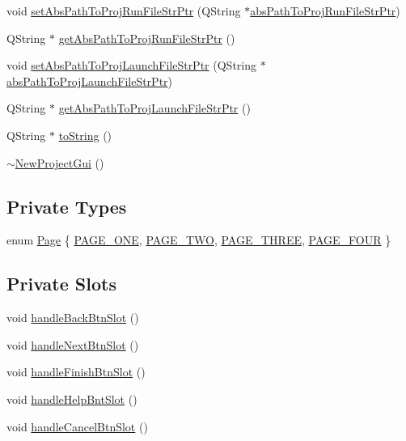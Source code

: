 \begin{DoxyCompactItemize}
\item 
void \hyperlink{class_new_project_gui_ab70a65b041c40d501a431bb7ba3f5ad1}{set\-Abs\-Path\-To\-Proj\-Run\-File\-Str\-Ptr} (Q\-String $\ast$\hyperlink{class_new_project_gui_ad8f25243a46ce10b6f1bc0c9ddb3e7eb}{abs\-Path\-To\-Proj\-Run\-File\-Str\-Ptr})
\item 
Q\-String $\ast$ \hyperlink{class_new_project_gui_ae32efb6021b235257d0b0092180e121b}{get\-Abs\-Path\-To\-Proj\-Run\-File\-Str\-Ptr} ()
\item 
void \hyperlink{class_new_project_gui_af90561864043fb757f8db808aadfa4b6}{set\-Abs\-Path\-To\-Proj\-Launch\-File\-Str\-Ptr} (Q\-String $\ast$\hyperlink{class_new_project_gui_a9056b4e1033cde862dd86bac6c0c6070}{abs\-Path\-To\-Proj\-Launch\-File\-Str\-Ptr})
\item 
Q\-String $\ast$ \hyperlink{class_new_project_gui_a6271114ad664216313d2427eb51820ab}{get\-Abs\-Path\-To\-Proj\-Launch\-File\-Str\-Ptr} ()
\item 
Q\-String $\ast$ \hyperlink{class_new_project_gui_a06d242dd2c162f66284bf468e17c5c73}{to\-String} ()
\item 
\hyperlink{class_new_project_gui_a2057fcc82bc632a4c7c506274dd45fe1}{$\sim$\-New\-Project\-Gui} ()
\end{DoxyCompactItemize}
\subsection*{Private Types}
\begin{DoxyCompactItemize}
\item 
enum \hyperlink{class_new_project_gui_a7dd25d019611ddc0fd2b357e0f3a446c}{Page} \{ \hyperlink{class_new_project_gui_a7dd25d019611ddc0fd2b357e0f3a446ca395ebc3cb6570b4ccb4c2909346117f2}{P\-A\-G\-E\-\_\-\-O\-N\-E}, 
\hyperlink{class_new_project_gui_a7dd25d019611ddc0fd2b357e0f3a446ca1e6736f0205ad831d43236b4f1caaf36}{P\-A\-G\-E\-\_\-\-T\-W\-O}, 
\hyperlink{class_new_project_gui_a7dd25d019611ddc0fd2b357e0f3a446ca04d537b5c5c745eb5ded027596826e5f}{P\-A\-G\-E\-\_\-\-T\-H\-R\-E\-E}, 
\hyperlink{class_new_project_gui_a7dd25d019611ddc0fd2b357e0f3a446ca30dbd5f0bc435ce807a2d71ce1458322}{P\-A\-G\-E\-\_\-\-F\-O\-U\-R}
 \}
\end{DoxyCompactItemize}
\subsection*{Private Slots}
\begin{DoxyCompactItemize}
\item 
void \hyperlink{class_new_project_gui_ae8c086687f029bada59f3934aa16ad9b}{handle\-Back\-Btn\-Slot} ()
\item 
void \hyperlink{class_new_project_gui_a247f62254e88454615d89be32464ce28}{handle\-Next\-Btn\-Slot} ()
\item 
void \hyperlink{class_new_project_gui_ad47832cd6388ea36101b1e0002837546}{handle\-Finish\-Btn\-Slot} ()
\item 
void \hyperlink{class_new_project_gui_a241a3a40b5f749cff7813e29c169b742}{handle\-Help\-Bnt\-Slot} ()
\item 
void \hyperlink{class_new_project_gui_ad25d0850e202e697203583fb4665004e}{handle\-Cancel\-Btn\-Slot} ()
\end{DoxyCompactItemize}
